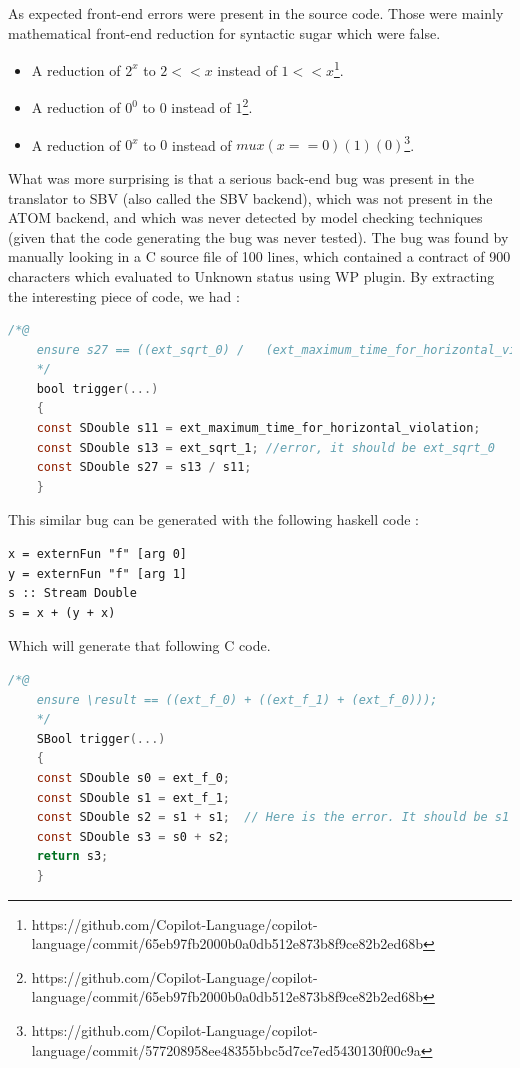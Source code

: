\documentclass[a4paper,11pt,final]{article}
\begin{document}
	As expected front-end errors were present in the source code. Those were mainly mathematical front-end reduction for syntactic sugar which were false.
	
	\begin{itemize}
		\item A reduction of $2^x$ to $2 << x$ instead of $1 << x$\footnote{https://github.com/Copilot-Language/copilot-language/commit/65eb97fb2000b0a0db512e873b8f9ce82b2ed68b}.
		\item A reduction of $0^0$ to $0$ instead of $1$\footnote{https://github.com/Copilot-Language/copilot-language/commit/65eb97fb2000b0a0db512e873b8f9ce82b2ed68b}.
		\item A reduction of $0^x$ to $0$ instead of $mux (x==0) (1) (0)$\footnote{https://github.com/Copilot-Language/copilot-language/commit/577208958ee48355bbc5d7ce7ed5430130f00c9a}.
	\end{itemize}
	
	What was more surprising is that a serious back-end bug was present in the translator to SBV (also called the SBV backend), which was not present in the ATOM backend, and which was never detected by model checking techniques (given that the code generating the bug was never tested). The bug was found by manually looking in a C source file of 100 lines, which contained a contract of 900 characters which evaluated to Unknown status using WP plugin. By extracting the interesting piece of code, we had :
	\begin{lstlisting}[language=C, keywordstyle=\color{blue}]
	/*@
	ensure s27 == ((ext_sqrt_0) /   (ext_maximum_time_for_horizontal_violation));
	*/
	bool trigger(...)
	{
	const SDouble s11 = ext_maximum_time_for_horizontal_violation;
	const SDouble s13 = ext_sqrt_1; //error, it should be ext_sqrt_0
	const SDouble s27 = s13 / s11;
	}  \end{lstlisting}
	This similar bug can be generated with the following haskell code :
\begin{verbatim}
x = externFun "f" [arg 0]
y = externFun "f" [arg 1]
s :: Stream Double
s = x + (y + x)
\end{verbatim}
	Which will generate that following C code.
	\begin{lstlisting}[language=C, keywordstyle=\color{blue}]
	/*@
	ensure \result == ((ext_f_0) + ((ext_f_1) + (ext_f_0)));
	*/
	SBool trigger(...)
	{
	const SDouble s0 = ext_f_0;
	const SDouble s1 = ext_f_1;
	const SDouble s2 = s1 + s1;  // Here is the error. It should be s1 + s0;
	const SDouble s3 = s0 + s2;
	return s3;
	}  \end{lstlisting}
	
\end{document}
